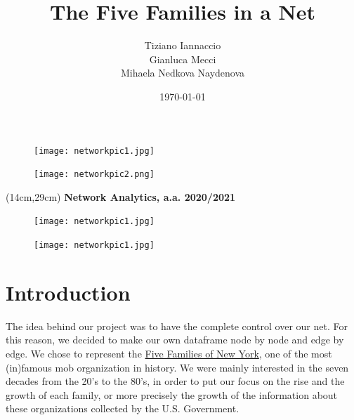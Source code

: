 \documentclass{article}
\title{\vspace{-50pt}\huge\textbf{The Five Families in a Net}}
\author{Tiziano Iannaccio \\ Gianluca Mecci \\ Mihaela Nedkova Naydenova}
\date{\today}
\begin{document}
\maketitle
\pagecolor{Pagine}
\thispagestyle{empty} %



\begin{figure}[t!]
\vspace{-250pt}
\centering
\texttt{[image: networkpic1.jpg]}
\advance\leftskip-3.52cm
\end{figure}



\begin{figure}[h!]
\vspace{-25pt}
\centering
\texttt{[image: networkpic2.png]}
\advance\leftskip-1.5cm
\end{figure}



\begin{textblock*}{5cm}(14cm,29cm) 
\textbf{Network Analytics, a.a. 2020/2021}
\end{textblock*}
\newpage



\hypersetup{linkcolor=black}



\begin{figure}[t!]
\vspace{-250pt}
\centering
\texttt{[image: networkpic1.jpg]}
\advance\leftskip-3.52cm
\end{figure}



\tableofcontents
{}
\hypersetup{linkcolor=blue}
\newpage



\begin{figure}[t!]
\vspace{-250pt}
\centering
\texttt{[image: networkpic1.jpg]}
\advance\leftskip-3.52cm
\end{figure}



\section*{\textcolor{Titoli}{Introduction}}
The idea behind our project was to have the complete control over our net. For this reason, we decided to make our own dataframe node by node and edge by edge. We chose to represent the \href{https://en.wikipedia.org/wiki/Five_Families}{Five Families of New York}, one of the most (in)famous mob organization in history. We were mainly interested in the seven decades from the 20's to the 80's, in order to put our focus on the rise and the growth of each family, or more precisely the growth of the information about these organizations collected by the U.S. Government.
\vspace{30pt}
\end{document}
